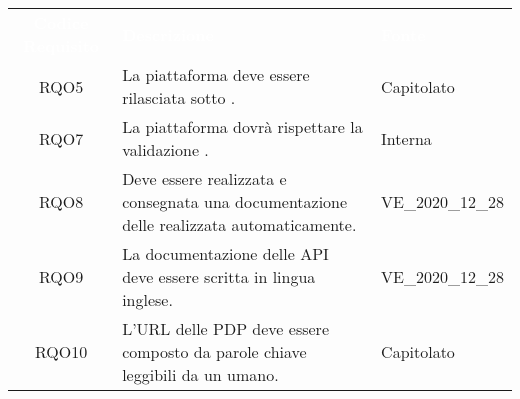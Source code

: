\renewcommand{\arraystretch}{1.5}
\begin{longtable}{|c C{9.5cm} C{2.5cm}|} 
	
	\textcolor{white}{\textbf{Codice Requisito}}&
	\textcolor{white}{\textbf{Descrizione}}&
	\textcolor{white}{\textbf{Fonte}}\\	

	RQO5 & La piattaforma deve essere rilasciata sotto . & Capitolato  \\

	RQO7 & La piattaforma dovrà rispettare la validazione . & Interna \\
	
	RQO8 & Deve essere realizzata e consegnata una documentazione delle  realizzata automaticamente. & VE\_2020\_12\_28 \\
	
	RQO9 & La documentazione delle API deve essere scritta in lingua inglese. & VE\_2020\_12\_28 \\
	
	RQO10 & L'URL delle PDP deve essere composto da parole chiave leggibili da un umano. & Capitolato \\
	
\end{longtable}
